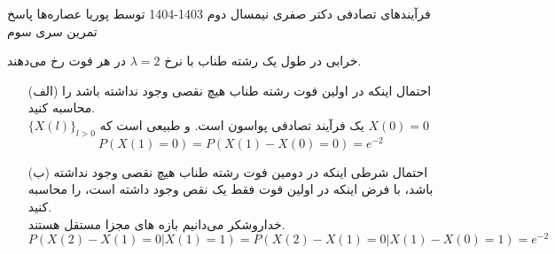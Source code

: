 \documentclass[11pt, a4, twoside]{article}
\begin{document}
	\pagestyle{empty}
	\heading
	{فرآیندهای تصادفی}
	{دکتر صفری}
	{نیمسال دوم 1403-1404}
    {توسط پوریا عصاره‌ها}
    {پاسخ تمرین سری سوم}

\begin{problem}
    خرابی در طول یک رشته طناب با نرخ $\lambda = 2$ در هر فوت رخ می‌دهند.

    \begin{itemize}
    \item[(الف)] احتمال اینکه در اولین فوت رشته طناب هیچ نقصی وجود نداشته باشد را محاسبه کنید.
    {\\ \color{blue}
    \(\{X(l)\}_{l>0}\) یک فرآیند تصادفی پواسون است. و طبیعی است که \(X(0) = 0\)
    \[P(X(1) = 0) = P(X(1) - X(0) = 0) = e^{-2}\]
    }
    \item[(ب)] احتمال شرطی اینکه در دومین فوت رشته طناب هیچ نقصی وجود نداشته باشد، با فرض اینکه در اولین فوت فقط یک نقص وجود داشته است، را محاسبه کنید.
    {\\ \color{blue}
    خداروشکر می‌دانیم بازه های مجزا مستقل هستند.
    \[P(X(2) - X(1) = 0 | X(1) = 1) = P(X(2) - X(1) = 0 | X(1) - X(0) = 1) = e^{-2}\]
    }
    \end{itemize}

\end{problem}
\end{document}

